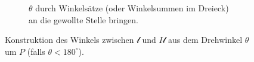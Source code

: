 \documentclass[a4paper, ngerman]{article}
\numberwithin{equation}{chapter}
\theoremstyle{plain}
\theoremstyle{definition}
\begin{document}
\begin{figure}
\begin{subfigure}{0.45\textwidth}
        \caption{\(\theta\) durch Winkelsätze (oder Winkelsummen im Dreieck) an die gewollte Stelle bringen.}
        \label{fig:third}
    \end{subfigure}
            
    \caption{Konstruktion des Winkels zwischen \(\mathscr l\) und \(I\mathscr l\) aus dem Drehwinkel \(\theta\) um \(P\) (falls \(\theta <180^\circ\)).}
    \label{fig:konstruktion-alpha-kleiner-180}
\end{figure}
\end{document}
